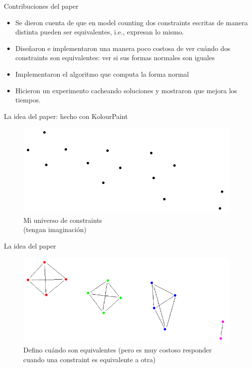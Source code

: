 \documentclass[10pt]{beamer}
\begin{document}
\begin{frame}{Contribuciones del paper}
\begin{itemize}
	\item Se dieron cuenta de que en model counting dos constraints escritas de manera distinta pueden ser equivalentes, i.e., expresan lo mismo.
	\item Diseñaron e implementaron una manera poco costosa de ver cuándo dos constraints son equivalentes: ver si sus formas normales son iguales
	\item Implementaron el algoritmo que computa la forma normal
	\item Hicieron un experimento cacheando soluciones y mostraron que mejora los tiempos.
\end{itemize}
\end{frame}



\begin{frame}{La idea del paper: hecho con KolourPaint}
\begin{figure}[H]
\centering
    \includegraphics[scale=0.6]{plot1.png}
    \captionsetup{labelformat=empty}
    \caption{Mi universo de constraints\\(tengan imaginación)}
\end{figure}
\end{frame}

\begin{frame}{La idea del paper}
\begin{figure}[H]
\centering
    \includegraphics[scale=0.6]{plot2.png}
    \captionsetup{labelformat=empty}
    \caption{Defino cuándo son equivalentes (pero es muy costoso responder cuando una constraint es equivalente a otra)} %
\end{figure}
\end{frame}
\end{document}
